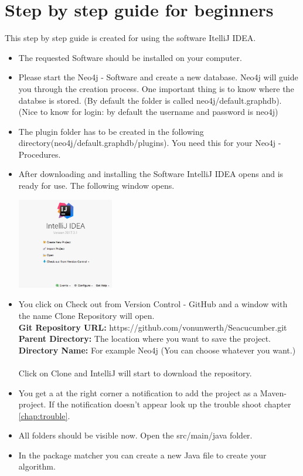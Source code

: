 \section{Step by step guide for beginners}\label{sec:stepByStepManual}
This step by step guide is created for using the software \glqq ItelliJ IDEA\grqq{}.
\begin{itemize}
	\item The requested Software should be installed on your computer.
	\item Please start the Neo4j - Software and create a new database. Neo4j will guide you through the creation process. One important thing is to know where the databse is stored. (By default the folder is called neo4j/default.graphdb). \\(Nice to know for login: by default the username and password is neo4j)
	\item The plugin folder has to be created in the following directory(neo4j/default.graphdb/plugins). You need this for your \glqq  Neo4j - Procedures\grqq{}.
	\newpage
	\item After downloading and installing the Software \glqq IntelliJ IDEA\grqq{} opens and is ready for use. The following window opens. \\
	\begin{center}
		\includegraphics[width=4.2cm]{common/IntelliJstart.png}\setlength{\unitlength}{1mm}
	\end{center}
	
	\item You click on \glqq Check out from Version Control - GitHub\grqq{} and a window with the name \glqq Clone Repository\grqq{} will open. \\
	\textbf{Git Repository URL:} https://github.com/vonunwerth/Seacucumber.git \\
	\textbf{Parent Directory:} The location where you want to save the project.  \\
	\textbf{Directory Name:} For example Neo4j (You can choose whatever you want.)\\
	\\
	Click on Clone and IntelliJ will start to download the repository.
	
	\item You get a at the right corner a notification to add the project as a Maven-project. If the notification doesn't appear look up the trouble shoot chapter \ref{chap:trouble}.
	
	\item All folders should be visible now. Open the src/main/java folder.
	\item In the \glqq package matcher\grqq{} you can create a new Java file to create your algorithm.
\end{itemize}

